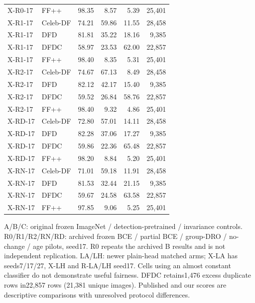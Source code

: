 \documentclass[10pt]{article}
\newcommand{\note}[1]{{\fontsize{8}{10}\selectfont #1\par}}
\begin{document}
{\begin{longtable}{llrrrr}
X-R0-17 & FF++ & 98.35 & 8.57 & 5.39 & 25,401\\
X-R1-17 & Celeb-DF & 74.21 & 59.86 & 11.55 & 28,458\\
X-R1-17 & DFD & 81.81 & 35.22 & 18.16 & 9,385\\
X-R1-17 & DFDC & 58.97 & 23.53 & 62.00 & 22,857\\
X-R1-17 & FF++ & 98.40 & 8.35 & 5.31 & 25,401\\
X-R2-17 & Celeb-DF & 74.67 & 67.13 & 8.49 & 28,458\\
X-R2-17 & DFD & 82.12 & 42.17 & 15.40 & 9,385\\
X-R2-17 & DFDC & 59.52 & 26.84 & 58.76 & 22,857\\
X-R2-17 & FF++ & 98.40 & 9.32 & 4.86 & 25,401\\
X-RD-17 & Celeb-DF & 72.80 & 57.01 & 14.11 & 28,458\\
X-RD-17 & DFD & 82.28 & 37.06 & 17.27 & 9,385\\
X-RD-17 & DFDC & 59.86 & 22.36 & 65.48 & 22,857\\
X-RD-17 & FF++ & 98.20 & 8.84 & 5.20 & 25,401\\
X-RN-17 & Celeb-DF & 71.01 & 59.18 & 11.91 & 28,458\\
X-RN-17 & DFD & 81.53 & 32.44 & 21.15 & 9,385\\
X-RN-17 & DFDC & 59.67 & 24.58 & 63.58 & 22,857\\
X-RN-17 & FF++ & 97.85 & 9.06 & 5.25 & 25,401\\
\bottomrule\end{longtable}}
\note{A/B/C: original frozen ImageNet / detection-pretrained / invariance controls. R0/R1/R2/RN/RD: archived frozen BCE / partial BCE / group-DRO / no-change / age pilots, seed17. R0 repeats the archived B results and is not independent replication. LA/LH: newer plain-head matched arms; X-LA has seeds7/17/27, X-LH and R-LA/LH seed17. Cells using an almost constant classifier do not demonstrate useful fairness. DFDC retains1,476 excess duplicate rows in22,857 rows (21,381 unique images). Published and our scores are descriptive comparisons with unresolved protocol differences.}
\end{document}
